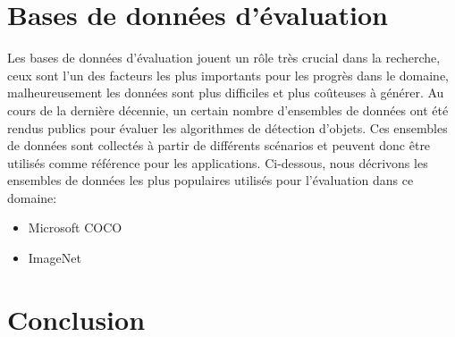 \section{Bases de données d'évaluation} 
Les bases de données d'évaluation jouent un rôle très crucial dans la recherche, ceux sont l'un des facteurs les plus importants pour les progrès dans le domaine, malheureusement les données sont plus difficiles et plus coûteuses à générer. Au cours de la dernière décennie, un certain nombre d'ensembles de données ont été rendus publics pour évaluer les algorithmes de détection d'objets. Ces ensembles de données sont collectés à partir de différents scénarios et peuvent donc être utilisés comme référence pour les applications. Ci-dessous, nous décrivons les ensembles de données  les plus populaires utilisés pour l'évaluation dans ce domaine:

\begin{itemize}
\item Microsoft COCO \cite{db1}
\item ImageNet \cite{db2}
\end{itemize}



\section{Conclusion} 
